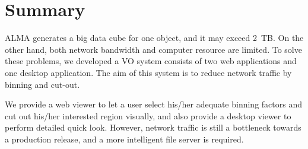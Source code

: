 \section{Summary}

ALMA generates a big data cube for one object, and it may exceed 2\ TB.
On the other hand, both network bandwidth and computer resource are limited.
To solve these problems, we developed a VO system consists of two web applications
and one desktop application.
The aim of this system is to reduce network traffic by binning and cut-out.

We provide a web viewer to let a user select his/her adequate binning factors
and cut out his/her interested region visually, and also provide a desktop viewer
to perform detailed quick look.
However, network traffic is still a bottleneck towards a production release,
and a more intelligent file server is required.


